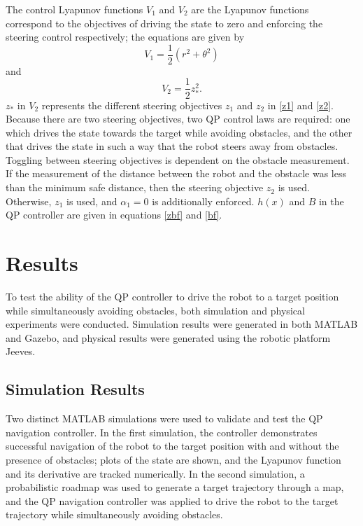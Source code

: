\documentclass[journal]{IEEEtran}
\begin{document}
The control Lyapunov functions $V_1$ and $V_2$ are the Lyapunov functions correspond to the objectives of driving the state to zero and enforcing the steering control respectively; the equations are given by 
\begin{equation}
V_1=\frac{1}{2}(r^2+\theta^2)
\end{equation} and
\begin{equation}
V_2=\frac{1}{2}z_*^2.
\end{equation}
$z_*$ in $V_2$ represents the different steering objectives $z_1$ and $z_2$ in \eqref{z1} and \eqref{z2}. Because there are two steering objectives, two QP control laws are required: one which drives the state towards the target while avoiding obstacles, and the other that drives the state in such a way that the robot steers away from obstacles. Toggling between steering objectives is dependent on the obstacle measurement. If the measurement of the distance between the robot and the obstacle was less than the minimum safe distance, then the steering objective $z_2$ is used. Otherwise, $z_1$ is used, and $\alpha_1=0$ is additionally enforced. $h(x)$ and $B$ in the QP controller are given in equations \eqref{zbf} and \eqref{bf}. 

\section{Results}
To test the ability of the QP controller to drive the robot to a target position while simultaneously avoiding obstacles, both simulation and physical experiments were conducted. Simulation results were generated in both MATLAB and Gazebo, and physical results were generated using the robotic platform Jeeves. 

\subsection{Simulation Results}
Two distinct MATLAB simulations were used to validate and test the QP navigation controller. In the first simulation, the controller demonstrates successful navigation of the robot to the target position with and without the presence of obstacles; plots of the state are shown, and the Lyapunov function and its derivative are tracked numerically. In the second simulation, a probabilistic roadmap was used to generate a target trajectory through a map, and the QP navigation controller was applied to drive the robot to the target trajectory while simultaneously avoiding obstacles. 
\end{document}
